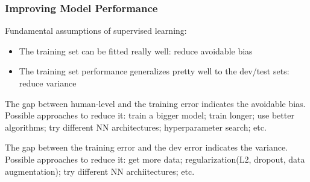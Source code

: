 \subsubsection{Improving Model Performance}
Fundamental assumptions of supervised learning:
\begin{itemize}
  \item The training set can be fitted really well: reduce avoidable bias
  \item The training set performance generalizes pretty well to the dev/test sets: reduce variance
\end{itemize}
The gap between human-level and the training error indicates the avoidable bias. Possible approaches to reduce it: train a bigger model; train longer; use better algorithms; try different NN architectures; hyperparameter search; etc.

The gap between the training error and the dev error indicates the variance. Possible approaches to reduce it: get more data; regularization(L2, dropout, data augmentation); try different NN archiitectures; etc.
\ifx\PREAMBLE\undefined

\fi